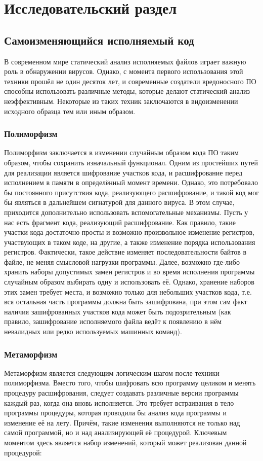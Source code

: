 \section {Исследовательский раздел}
\subsection {Самоизменяющийся исполняемый код}
В современном мире статический анализ исполняемых файлов играет важную роль в обнаружении вирусов. Однако, с момента первого использования этой техники прошёл не один десяток лет, и современные создатели вредоносного ПО способны использовать  различные методы, которые делают статический анализ неэффективным. Некоторые из таких техник заключаются в видоизменении исходного образца тем или иным образом. 
\subsubsection {Полиморфизм}
Полиморфизм заключается в изменении случайным образом кода ПО таким образом, чтобы сохранить изначальный функционал. Одним из простейших путей для реализации является шифрование участков кода, и расшифрование перед исполнением в памяти в определённый момент времени. Однако, это потребовало бы постоянного присутствия кода, реализующего расшифрование, и такой код мог бы являться в дальнейшем сигнатурой для данного вируса. В этом случае, приходится дополнительно использовать вспомогательные механизмы. Пусть у нас есть фрагмент кода, реализующий расшифрование. Как правило, такие участки кода достаточно просты и возможно произвольное изменение регистров, участвующих в таком коде, на другие, а также изменение порядка использования регистров. Фактически, такое действие изменяет последовательности байтов в файле, не меняя смысловой нагрузки программы. Далее, возможно где-либо хранить наборы допустимых замен регистров и во время исполнения программы случайным образом выбирать одну и использовать её. Однако, хранение наборов этих замен требует места, и возможно только для небольших участков кода, т.е. вся остальная часть программы должна быть зашифрована, при этом сам факт наличия зашифрованных участков кода может быть подозрительным (как правило, зашифрование исполняемого файла ведёт к появлению в нём невалидных или редко используемых машинных команд).
\subsubsection {Метаморфизм}
Метаморфизм является следующим логическим шагом после техники полиморфизма. Вместо того, чтобы шифровать всю программу целиком и менять процедуру расшифрования, следует создавать различные версии программы каждый раз, когда она вновь исполняется. Это требует встраивания в тело программы процедуры, которая проводила бы анализ кода программы и изменение её на лету. Причём, такие изменения выполняются не только над самой программой, но и над анализирующей её процедурой. Ключевым моментом здесь является набор изменений, который может реализован данной процедурой:
\lstset{style=masm}

